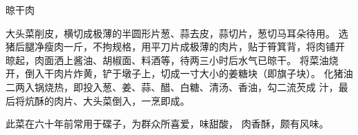 \begin{recipe}{晾干肉}

\ingredients



\cooking

\step 大头菜削皮，横切成极薄的半圆形片葱、蒜去皮，蒜切片，葱切马耳朵待用。
\step 选猪后腿净瘦肉一斤，不拘规格，用平刀片成极薄的肉片，贴于筲箕背，将肉铺开
晾起，肉面洒上酱油、胡椒面、料酒等，待两三小时后水气已晾干。
\step 将菜油烧开，倒入干肉片炸黄，铲于墩子上，切成一寸大小的姜糖块（即旗子块）。
\step 化猪油二两入锅烧热，即投入葱、姜、蒜、醋、白糖、清汤、香油，勾二流芡成
汁，最后将炕酥的肉片、大头菜倒入，一烹即成。

\features

此菜在六十年前常用于碟子，为群众所喜爱，味甜酸， 肉香酥，颇有风味。

\end{recipe}

